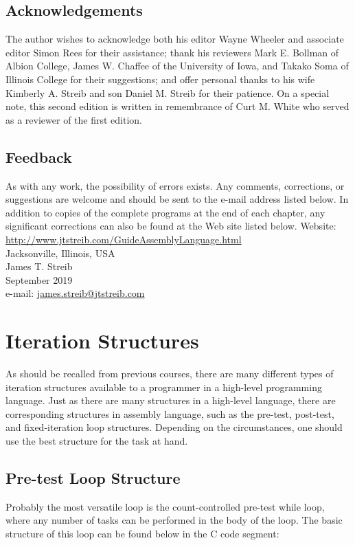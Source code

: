 \documentclass[10pt]{book}
\begin{document}
\section{Acknowledgements}
The author wishes to acknowledge both his editor Wayne Wheeler and associate editor Simon Rees for their assistance; thank his reviewers Mark E. Bollman of Albion College, James W. Chaffee of the University of Iowa, and Takako Soma of Illinois College for their suggestions; and offer personal thanks to his wife Kimberly A. Streib and son Daniel M. Streib for their patience. On a special note, this second edition is written in remembrance of Curt M. White who served as a reviewer of the first edition.

\section{Feedback}
As with any work, the possibility of errors exists. Any comments, corrections, or suggestions are welcome and should be sent to the e-mail address listed below. In addition to copies of the complete programs at the end of each chapter, any significant corrections can also be found at the Web site listed below.
Website: \href{http://www.jtstreib.com/GuideAssemblyLanguage.html}{http://www.jtstreib.com/GuideAssemblyLanguage.html}\\
Jacksonville, Illinois, USA\\
James T. Streib\\
September 2019\\
e-mail: \href{mailto:james.streib@jtstreib.com}{james.streib@jtstreib.com}

\tableofcontents

\chapter{Iteration Structures}
As should be recalled from previous courses, there are many different types of iteration structures available to a programmer in a high-level programming language. Just as there are many structures in a high-level language, there are corresponding structures in assembly language, such as the pre-test, post-test, and fixed-iteration loop structures. Depending on the circumstances, one should use the best structure for the task at hand.

\section{Pre-test Loop Structure}
Probably the most versatile loop is the count-controlled pre-test while loop, where any number of tasks can be performed in the body of the loop. The basic structure of this loop can be found below in the C code segment:
\end{document}
